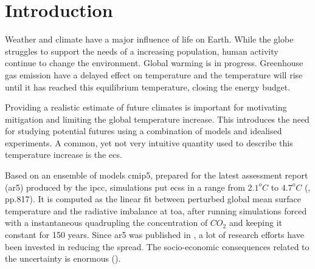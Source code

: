 \chapter{Introduction} \label{ch:introduction}
Weather and climate have a major influence of life on Earth. While the globe struggles to support the needs of a increasing population, human activity continue to change the environment. %
Global warming is in progress. Greenhouse gas emission have a delayed effect on temperature and the temperature will rise until it has reached this equilibrium temperature, closing the energy budget. 

Providing a realistic estimate of future climates is important for motivating mitigation and limiting the global temperature increase. 
This introduces the need for studying potential futures using a combination of models and idealised experiments. A common, yet not very intuitive quantity used to describe this temperature increase is the \acrfull{ecs}. 

Based on an ensemble of models \acrfull{cmip5}, prepared for the latest assessment report (\acrshort{ar5}) produced by the \acrfull{ipcc}, simulations put \acrshort{ecs}s in a range from $2.1^oC$ to $4.7^oC$ (\cite{IPCC_CH9_climate_models}, pp.817). It is computed as the linear fit between perturbed global mean surface temperature and the radiative imbalance at \acrfull{toa}, after running simulations forced with a instantaneous quadrupling the concentration %
of $CO_2$ and keeping it constant for 150 years. Since \acrshort{ar5} was published in \citeyear{IPCC_entire_book}, a lot of research efforts have been invested in reducing the spread. The socio-economic consequences related to the uncertainty is enormous (\cite{bony2015}). 


